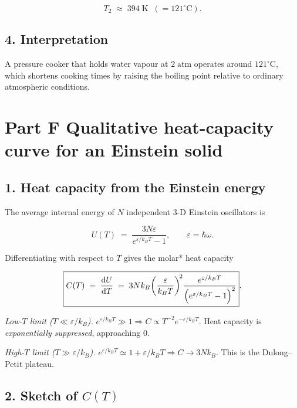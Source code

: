 \documentclass[12pt]{article}
\theoremstyle{definition} %
\theoremstyle{plain} %
\begin{document}
\[
  \boxed{T_2 \;\approx\; 394\;\text{K}
         \;\;(= 121^{\circ}\text{C}) }.
\]

\subsection*{4.  Interpretation}

A pressure cooker that holds water vapour at \(2\;\text{atm}\) operates
around \(121^{\circ}\text{C}\), which shortens cooking times by raising the
boiling point relative to ordinary atmospheric conditions.
\section*{Part F Qualitative heat-capacity curve for an Einstein solid}

\subsection*{1.  Heat capacity from the Einstein energy}

The average internal energy of \(N\) independent 3-D Einstein oscillators is  

\[
  U(T)\;=\;\frac{3N\varepsilon}{e^{\varepsilon/k_BT}-1},
\qquad
  \varepsilon = \hbar\omega .
\]

Differentiating with respect to \(T\) gives the molar* heat capacity  

\[
  \boxed{%
    C(T)\;=\;\frac{\mathrm{d}U}{\mathrm{d}T}
      \;=\;
      3Nk_B
      \biggl(\frac{\varepsilon}{k_BT}\biggr)^{\!2}
      \frac{e^{\varepsilon/k_BT}}
           {\Bigl(e^{\varepsilon/k_BT}-1\Bigr)^{2}}
  }.
\]

\emph{Low-\(T\) limit (\(T\ll\varepsilon/k_B\)).}  
\(e^{\varepsilon/k_BT}\gg1\Rightarrow C\propto T^{-2}e^{-\varepsilon/k_BT}\).
Heat capacity is \emph{exponentially suppressed}, approaching \(0\).

\emph{High-\(T\) limit (\(T\gg\varepsilon/k_B\)).}
\(e^{\varepsilon/k_BT}\simeq1+\varepsilon/k_BT\Rightarrow C\to3Nk_B\).  
This is the Dulong–Petit plateau.

\subsection*{2.  Sketch of \(C(T)\)}

\begin{center}
\end{center}
\end{document}
